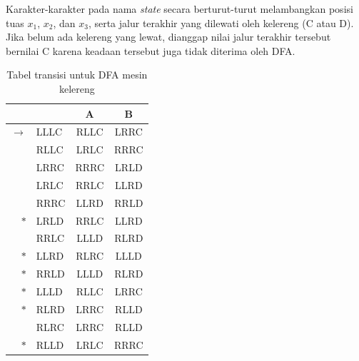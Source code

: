 \documentclass[a4paper,titlepage]{article}
\begin{document}
		Karakter-karakter pada nama \textit{state} secara berturut-turut melambangkan posisi tuas $x_1$, $x_2$, dan $x_3$, serta jalur terakhir yang dilewati oleh kelereng (C atau D). Jika belum ada kelereng yang lewat, dianggap nilai jalur terakhir tersebut bernilai C karena keadaan tersebut juga tidak diterima oleh DFA.

		\begin{table}[H]
			\centering
			\begin{tabular}{@{}rlcc@{}}
				\toprule
				              &      & A    & B    \\ \midrule
				$\rightarrow$ & LLLC & RLLC & LRRC \\
				              & RLLC & LRLC & RRRC \\
				              & LRRC & RRRC & LRLD \\
				              & LRLC & RRLC & LLRD \\
				              & RRRC & LLRD & RRLD \\
				$\ast$        & LRLD & RRLC & LLRD \\
				              & RRLC & LLLD & RLRD \\
				$\ast$        & LLRD & RLRC & LLLD \\
				$\ast$        & RRLD & LLLD & RLRD \\
				$\ast$        & LLLD & RLLC & LRRC \\
				$\ast$        & RLRD & LRRC & RLLD \\
				              & RLRC & LRRC & RLLD \\
				$\ast$        & RLLD & LRLC & RRRC \\ \bottomrule
			\end{tabular}
			\caption{Tabel transisi untuk DFA mesin kelereng}
			\label{tab:marbledfa}
		\end{table}
\end{document}
